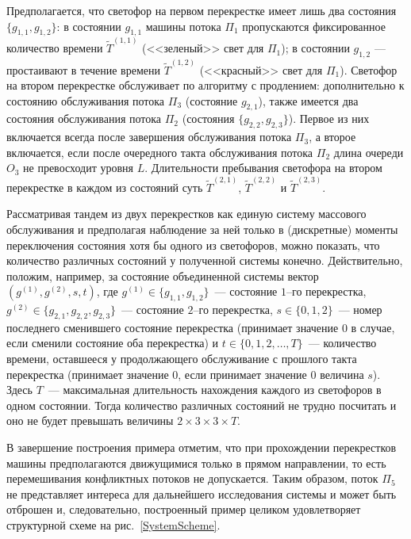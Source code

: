 \documentclass[12pt]{extarticle}
\theoremstyle{theorem}
\theoremstyle{remark}
\begin{document}
Предполагается, что светофор на первом перекрестке имеет лишь два состояния $\{g_{1,1},g_{1,2}\}$: в состоянии $g_{1,1}$ машины потока $\Pi_1$ пропускаются фиксированное количество времени $\widetilde T^{(1,1)}$ (<<зеленый>> свет для $\Pi_1$); в состоянии $g_{1,2}$ --- простаивают в течение времени $\widetilde T^{(1,2)}$ (<<красный>> свет для $\Pi_1$). Светофор на втором перекрестке обслуживает по алгоритму с продлением: дополнительно к состоянию обслуживания потока $\Pi_3$ (состояние $g_{2,1}$), также имеется два состояния обслуживания потока $\Pi_2$ (состояния $\{g_{2,2},g_{2,3}\}$). Первое из них включается всегда после завершения обслуживания потока $\Pi_3$, а второе включается, если после очередного такта обслуживания потока $\Pi_2$ длина очереди $O_3$ не превосходит уровня $L$.
Длительности пребывания светофора на втором перекрестке в каждом из состояний суть $\widetilde T^{(2,1)}$, $\widetilde T^{(2,2)}$ и $\widetilde T^{(2,3)}$.


Рассматривая тандем из двух перекрестков как единую систему массового обслуживания и предполагая наблюдение за ней только в (дискретные) моменты переключения состояния хотя бы одного из светофоров, можно показать, что количество различных состояний у полученной системы конечно. Действительно, положим, например, за состояние объединенной системы вектор $(g^{(1)},g^{(2)}, s, t)$, где $g^{(1)}\in \{g_{1,1},g_{1,2}\}$~--- состояние $1$--го перекрестка, $g^{(2)}\in \{g_{2,1},g_{2,2},g_{2,3}\}$~--- состояние $2$--го перекрестка, $s \in \{0, 1, 2\}$~--- номер последнего сменившего состояние перекрестка (принимает значение $0$ в случае, если сменили состояние оба перекрестка) и $t \in \{0, 1, 2, \ldots, T\}$~--- количество времени, оставшееся у продолжающего обслуживание с прошлого такта перекрестка (принимает значение $0$, если принимает значение $0$ величина $s$). Здесь $T$~--- максимальная длительность нахождения каждого из светофоров в одном состоянии. Тогда количество различных состояний не трудно посчитать и оно не будет превышать величины  $2\times 3 \times 3 \times T$.

В завершение построения примера отметим, что при прохождении перекрестков машины предполагаются движущимися только в прямом направлении, то есть перемешивания конфликтных потоков не допускается. Таким образом, поток $\Pi_5$ не представляет интереса для дальнейшего исследования системы и может быть отброшен и, следовательно, построенный пример целиком удовлетворяет структурной схеме на рис.~\ref{SystemScheme}.
\end{document}
